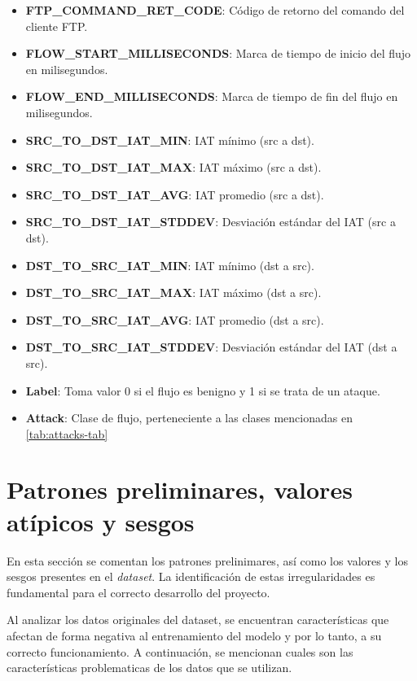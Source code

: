 \begin{itemize}
    \item \textbf{FTP\_COMMAND\_RET\_CODE}: Código de retorno del comando del cliente FTP.
    \item \textbf{FLOW\_START\_MILLISECONDS}: Marca de tiempo de inicio del flujo en milisegundos.
    \item \textbf{FLOW\_END\_MILLISECONDS}: Marca de tiempo de fin del flujo en milisegundos.
    \item \textbf{SRC\_TO\_DST\_IAT\_MIN}: IAT mínimo (src a dst).
    \item \textbf{SRC\_TO\_DST\_IAT\_MAX}: IAT máximo (src a dst).
    \item \textbf{SRC\_TO\_DST\_IAT\_AVG}: IAT promedio (src a dst).
    \item \textbf{SRC\_TO\_DST\_IAT\_STDDEV}: Desviación estándar del IAT (src a dst).
    \item \textbf{DST\_TO\_SRC\_IAT\_MIN}: IAT mínimo (dst a src).
    \item \textbf{DST\_TO\_SRC\_IAT\_MAX}: IAT máximo (dst a src).
    \item \textbf{DST\_TO\_SRC\_IAT\_AVG}: IAT promedio (dst a src).
    \item \textbf{DST\_TO\_SRC\_IAT\_STDDEV}: Desviación estándar del IAT (dst a src).
    \item \textbf{Label}: Toma valor 0 si el flujo es benigno y 1 si se trata de un ataque.
    \item \textbf{Attack}: Clase de flujo, perteneciente a las clases mencionadas en \ref{tab:attacks-tab} 
\end{itemize}

\section{Patrones preliminares, valores atípicos y sesgos} \label{sec.segos-datos}
En esta sección se comentan los patrones prelinimares, así como los valores y los sesgos presentes en el \textit{dataset}. La identificación de estas irregularidades es fundamental para el correcto desarrollo del proyecto.

Al analizar los datos originales del dataset, se encuentran características que afectan de forma negativa al entrenamiento del modelo y por lo tanto, a su correcto funcionamiento. A continuación, se mencionan cuales son las características problematicas de los datos que se utilizan.


